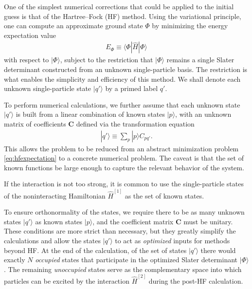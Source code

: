 One of the simplest numerical corrections that could be applied to the
initial guess is that of the Hartree--Fock (HF) method.  Using the
variational principle, one can compute an approximate ground state
$\Phi$ by minimizing the energy expectation value
\begin{align} \label{eq:hfexpectation}
  E_{\Phi} \equiv \langle \Phi | \hat H | \Phi \rangle
\end{align}
with respect to $|\Phi\rangle$, subject to the restriction that
$|\Phi\rangle$ remains a single Slater determinant constructed from an
unknown single-particle basis.  The restriction is what enables the
simplicity and efficiency of this method.  We shall denote each
unknown single-particle state $|q'\rangle$ by a primed label $q'$.

To perform numerical calculations, we further assume that each unknown
state $|q'\rangle$ is built from a linear combination of known states
$|p\rangle$, with an unknown matrix of coefficients $\bm C$ defined
via the transformation equation
\begin{align*}
  |q'\rangle \equiv \sum_p |p\rangle C_{pq'}.
\end{align*}
This allows the problem to be reduced from an abstract minimization
problem \eqref{eq:hfexpectation} to a concrete numerical problem.  The
caveat is that the set of known functions be large enough to capture
the relevant behavior of the system.

If the interaction is not too strong, it is common to use the
single-particle states of the noninteracting Hamiltonian
$\hat{H}^{[1]}$ as the set of known states.

To ensure orthonormality of the states, we require there to be as many
unknown states $|q'\rangle$ as known states $|p\rangle$, and the
coefficient matrix $\bm C$ must be unitary.  These conditions are more
strict than necessary, but they greatly simplify the calculations and
allow the states $|q'\rangle$ to act as \textit{optimized} inputs for
methods beyond HF.  At the end of the calculation, of the set of
states $|q'\rangle$ there would exactly $N$ \textit{occupied} states
that participate in the optimized Slater determinant $|\Phi\rangle$.
The remaining \textit{unoccupied} states serve as the complementary
space into which particles can be excited by the interaction
$\hat{H}^{[2]}$ during the post-HF calculation.

